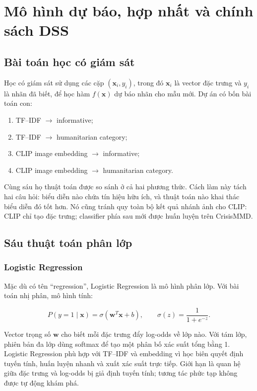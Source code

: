 \chapter{Mô hình dự báo, hợp nhất và chính sách DSS}
\label{chap:mohinh}\label{chap:dss}

\section{Bài toán học có giám sát}

Học có giám sát sử dụng các cặp \((\mathbf{x}_i,y_i)\), trong đó
\(\mathbf{x}_i\) là vector đặc trưng và \(y_i\) là nhãn đã biết, để học hàm
\(f(\mathbf{x})\) dự báo nhãn cho mẫu mới. Dự án có bốn bài toán con:

\begin{enumerate}[leftmargin=*]
  \item TF--IDF \(\rightarrow\) informative;
  \item TF--IDF \(\rightarrow\) humanitarian category;
  \item CLIP image embedding \(\rightarrow\) informative;
  \item CLIP image embedding \(\rightarrow\) humanitarian category.
\end{enumerate}

Cùng sáu họ thuật toán được so sánh ở cả hai phương thức. Cách làm này tách hai
câu hỏi: biểu diễn nào chứa tín hiệu hữu ích, và thuật toán nào khai thác biểu
diễn đó tốt hơn. Nó cũng tránh quy toàn bộ kết quả nhánh ảnh cho CLIP: CLIP chỉ
tạo đặc trưng; classifier phía sau mới được huấn luyện trên CrisisMMD.

\section{Sáu thuật toán phân lớp}

\subsection{Logistic Regression}

Mặc dù có tên ``regression'', Logistic Regression là mô hình phân lớp. Với bài
toán nhị phân, mô hình tính:

\[
P(y=1\mid\mathbf{x})=\sigma(\mathbf{w}^{T}\mathbf{x}+b),
\qquad
\sigma(z)=\frac{1}{1+e^{-z}}.
\]

Vector trọng số \(\mathbf{w}\) cho biết mỗi đặc trưng đẩy log-odds về lớp nào.
Với tám lớp, phiên bản đa lớp dùng softmax để tạo một phân bố xác suất tổng bằng
1. Logistic Regression phù hợp với TF--IDF và embedding vì học biên quyết định
tuyến tính, huấn luyện nhanh và xuất xác suất trực tiếp. Giới hạn là quan hệ
giữa đặc trưng và log-odds bị giả định tuyến tính; tương tác phức tạp không được
tự động khám phá.

